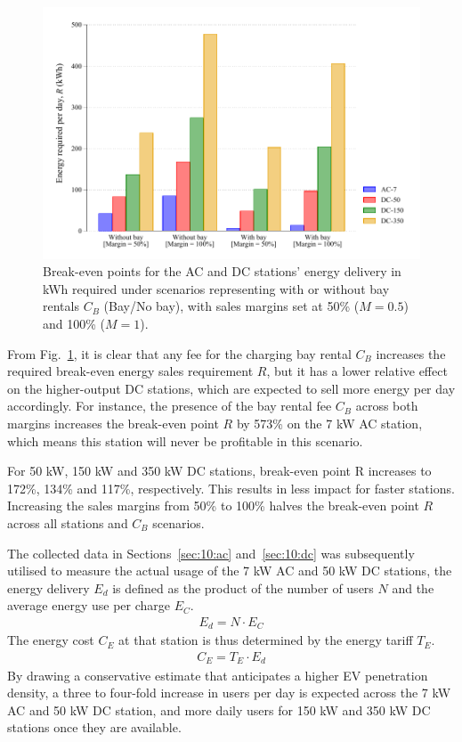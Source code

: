 \begin{figure}[H]
	\centering
	\includegraphics[width=0.8\linewidth]{costm}
	\caption[Break-even points on required energy delivery]{Break-even points for the AC and DC stations' energy delivery in kWh required under scenarios representing with or without bay rentals $C_B$ (Bay/No bay), with sales margins set at 50\% ($M=0.5$) and 100\% ($M=1$).}
	\label{fig:10:costm}
\end{figure}

From Fig.~\ref{fig:10:costm}, it is clear that any fee for the charging bay rental $C_B$ increases the required break-even energy sales requirement $R$, but it has a lower relative effect on the higher-output DC stations, which are expected to sell more energy per day accordingly. For instance, the presence of the bay rental fee $C_B$ across both margins increases the break-even point $R$ by 573\% on the 7 kW AC station, which means this station will never be profitable in this scenario.

For 50 kW, 150 kW and 350 kW DC stations, break-even point R increases to 172\%, 134\% and 117\%, respectively. This results in less impact for faster stations. Increasing the sales margins from 50\% to 100\% halves the break-even point $R$ across all stations and $C_B$ scenarios.

The collected data in Sections~\ref{sec:10:ac} and~\ref{sec:10:dc} was subsequently utilised to measure the actual usage of the 7 kW AC and 50 kW DC stations, the energy delivery $E_d$ is defined as the product of the number of users $N$ and the average energy use per charge $E_C$.
\begin{align}
E_d = N \cdot E_C
\end{align}
The energy cost $C_E$ at that station is thus determined by the energy tariff $T_E$.
\begin{align}
C_E = T_E \cdot E_d
\end{align}
By drawing a conservative estimate that anticipates a higher EV penetration density, a three to four-fold increase in users per day is expected across the 7 kW AC and 50 kW DC station, and more daily users for 150 kW and 350 kW DC stations once they are available. 

